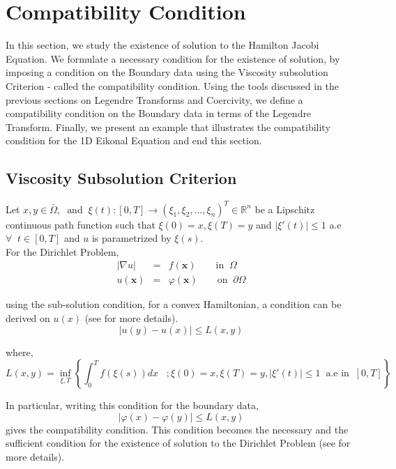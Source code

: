 \section{Compatibility Condition}
In this section, we study the existence of solution to the Hamilton
Jacobi Equation. We formulate a necessary condition for the existence
of solution, by imposing a condition on the Boundary data using the
Viscosity subsolution Criterion - called the
compatibility condition. Using the tools discussed in the previous
sections on Legendre Transforms and Coercivity, we define a
compatibility condition on the Boundary data in terms of the Legendre
Transform. Finally, we present an example that illustrates the
compatibility condition for the 1D Eikonal Equation and end this
section.

\subsection{Viscosity Subsolution Criterion}
Let $x,y \in \bar{\Omega}, \;\; \text{and} \;\; \xi(t):[0,T] \to
(\xi_1,\xi_2,\dots,\xi_n)^T \in \mathbb{R}^n$ be a Lipschitz
continuous path function such that $\xi(0) = x, \xi(T) = y$ and
$\lvert \xi'(t) \rvert \le 1$ a.e $\forall \;\;t \in [0,T]$ and $u$ is
parametrized by $\xi(s)$.\\

\noindent
For the Dirichlet Problem,
\begin{eqnarray}
  \lvert \nabla u \rvert &=& f(\mathbf{x}) \qquad \text{in} \;\;
  \Omega\nonumber\\
  u(\mathbf{x}) &=& \varphi(\mathbf{x}) \qquad \text{on} \;\; \partial
                    \Omega \nonumber
\end{eqnarray}

\noindent
using the sub-solution condition, for a convex Hamiltonian, a
condition can be derived on $u(x)$ (see \cite{yong} for more details).
\begin{equation}
  \lvert u(y)- u(x) \rvert \le L(x,y)
\end{equation}

\noindent
where,
\begin{equation}
  L(x,y) = \inf_{\xi,T}\left\{\int_{0}^{T} f(\xi(s)) dx \;\;\; ; \xi(0) =
  x, \xi(T) = y, \lvert \xi'(t) \rvert \le 1 \;\;\text{a.e in}\;\; [0,T]\right\}\label{eq:13}
\end{equation}

\noindent
In particular, writing this condition for the boundary data,
\begin{equation}
  \lvert \varphi(x) -\varphi(y) \rvert \le L(x,y)\label{eq:14}
\end{equation}
gives the compatibility condition. This condition becomes the
necessary and the sufficient condition for the existence of solution
to the Dirichlet Problem (see \cite{yong} for more details).

